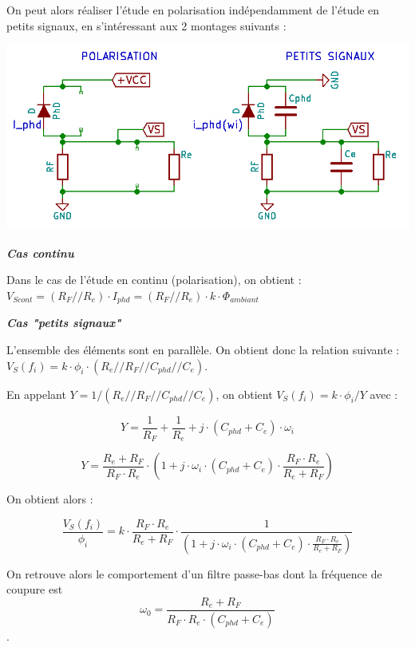 \documentclass[a4paper,french]{paper}
\begin{document}
		On peut alors réaliser l'étude en polarisation indépendamment de l'étude en petits signaux, en s'intéressant aux 2 montages suivants :

\begin{center}
	\includegraphics{images/photodetection_simple_modele_corr.png}
\end{center}

\textbf{\textit{Cas continu}}

Dans le cas de l'étude en continu (polarisation), on obtient : 
$V_{Scont} = (R_F // R_e) \cdot I_{phd} = (R_F // R_e) \cdot k \cdot \Phi_{ambiant}$


\textbf{\textit{Cas "petits signaux"}}

L'ensemble des éléments sont en parallèle. On obtient donc la relation suivante : $V_S(f_i) = k \cdot \phi_i \cdot (R_e // R_F // C_{phd} // C_e)$.
	
	En appelant $Y = 1/(R_e // R_F // C_{phd} // C_e)$, on obtient $V_S(f_i) = k \cdot \phi_i / Y$ avec :
	
	$$Y = \frac{1}{R_F} + \frac{1}{R_e} + j \cdot (C_{phd} + C_e) \cdot \omega_i$$
	
	$$Y = \frac{R_e + R_F}{R_F \cdot R_e} \cdot (1 + j \cdot \omega_i \cdot (C_{phd} + C_e) \cdot \frac{R_F \cdot R_e}{R_e + R_F})$$
	
	On obtient alors :
	
	$$\boxed{\frac{V_S(f_i)}{\phi_i} = k \cdot \frac{R_F \cdot R_e}{R_e + R_F} \cdot \frac{1}{(1 + j \cdot \omega_i \cdot (C_{phd} + C_e) \cdot \frac{R_F \cdot R_e}{R_e + R_F})}}$$
	
	On retrouve alors le comportement d'un filtre passe-bas dont la fréquence de coupure est $$\boxed{\omega_0 = \frac{R_e + R_F}{R_F \cdot R_e \cdot (C_{phd} + C_e)}}$$.
\end{document}
